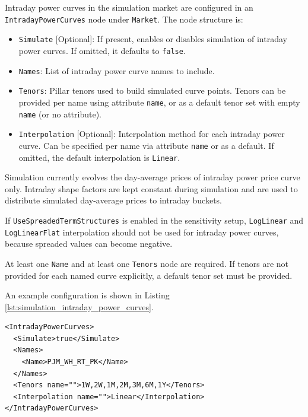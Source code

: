 Intraday power curves in the simulation market are configured in an \lstinline!IntradayPowerCurves! node under
\lstinline!Market!. The node structure is:

\begin{itemize}
\item \lstinline!Simulate! [Optional]: If present, enables or disables simulation of intraday power curves. If omitted,
  it defaults to \lstinline!false!.
\item \lstinline!Names!: List of intraday power curve names to include.
\item \lstinline!Tenors!: Pillar tenors used to build simulated curve points. Tenors can be provided per name using
  attribute \lstinline!name!, or as a default tenor set with empty \lstinline!name! (or no attribute).
\item \lstinline!Interpolation! [Optional]: Interpolation method for each intraday power curve. Can be specified per
  name via attribute \lstinline!name! or as a default. If omitted, the default interpolation is
  \lstinline!Linear!.
\end{itemize}

Simulation currently evolves the day-average prices of intraday power price curve only. Intraday shape factors are kept
constant during simulation and are used to distribute simulated day-average prices to intraday buckets.

If \lstinline!UseSpreadedTermStructures! is enabled in the sensitivity setup, \lstinline!LogLinear! and
\lstinline!LogLinearFlat! interpolation should not be used for intraday power curves, because spreaded values can
become negative.

At least one \lstinline!Name! and at least one \lstinline!Tenors! node are required.
If tenors are not provided for each named curve explicitly, a default tenor set must be provided.

An example configuration is shown in Listing \ref{lst:simulation_intraday_power_curves}.

\begin{listing}[H]
\begin{verbatim}
<IntradayPowerCurves>
  <Simulate>true</Simulate>
  <Names>
    <Name>PJM_WH_RT_PK</Name>
  </Names>
  <Tenors name="">1W,2W,1M,2M,3M,6M,1Y</Tenors>
  <Interpolation name="">Linear</Interpolation>
</IntradayPowerCurves>
\end{verbatim}
\caption{Simulation market intraday power curves configuration}
\label{lst:simulation_intraday_power_curves}
\end{listing}

